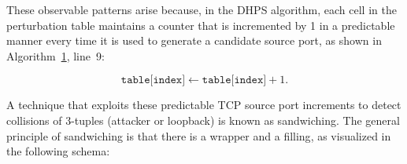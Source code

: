 \documentclass[twocolumn]{report}
\begin{document}
These observable patterns arise because, in the DHPS algorithm, each cell in the perturbation table maintains a counter that is incremented by 1 in a predictable manner every time it is used to generate a candidate source port, as shown in Algorithm~\hyperref[alg:dhps_port_selection]{1}, line~9:

\begin{minipage}{\columnwidth}
	\[
		\texttt{table[index]} \leftarrow \texttt{table[index]} + 1.
	\]
\end{minipage}

A technique that exploits these predictable TCP source port increments to detect collisions of 3-tuples (attacker or loopback) is known as \alert{sandwiching}. The general principle of sandwiching is that there is a \alert{wrapper} and a \alert{filling}, as visualized in the following schema:
\end{document}
